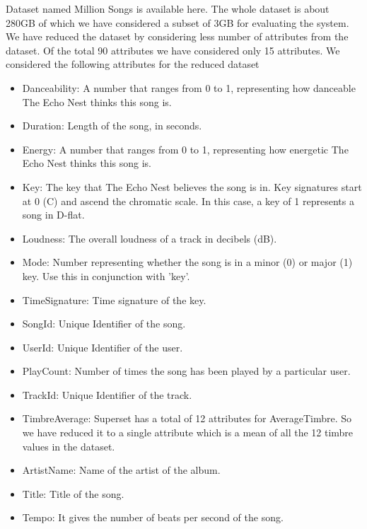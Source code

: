 \documentclass{sig-alternate-05-2015}
\begin{document}
Dataset named Million Songs is available here. The whole dataset is about 280GB of which we have considered a subset of 3GB for evaluating the system. We have reduced the dataset by considering less number of attributes from the dataset. Of the total 90 attributes we have considered only 15 attributes. We considered the following attributes for the reduced dataset
\begin{itemize}
    \item Danceability: A number that ranges from 0 to 1, representing how danceable The Echo Nest thinks this song is.
    \item Duration: Length of the song, in seconds.
    \item Energy: A number that ranges from 0 to 1, representing how energetic The Echo Nest thinks this song is.
    \item Key: The key that The Echo Nest believes the song is in. Key signatures start at 0 (C) and ascend the chromatic scale. In this case, a key of 1 represents a song in D-flat.
    \item Loudness: The overall loudness of a track in decibels (dB).
    \item Mode: Number representing whether the song is in a minor (0) or major (1) key. Use this in conjunction with 'key'.
    \item TimeSignature: Time signature of the key.
    \item SongId: Unique Identifier of the song.
    \item UserId: Unique Identifier of the user.
    \item PlayCount: Number of times the song has been played by a particular user.
    \item TrackId: Unique Identifier of the track.
    \item TimbreAverage: Superset has a total of 12 attributes for AverageTimbre. So we have reduced it to a single attribute which is a mean of all the 12 timbre values in the dataset.
    \item ArtistName: Name of the artist of the album.
    \item Title: Title of the song.
    \item Tempo: It gives the number of beats per second of the song.
\end{itemize}
\\\\\\\\\
\end{document}

